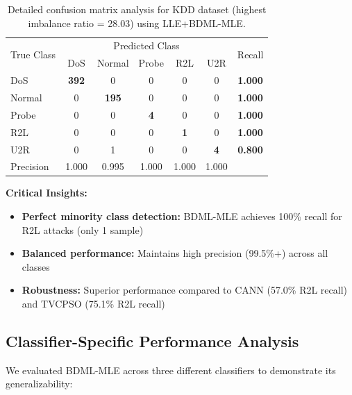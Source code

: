 \documentclass[review]{elsarticle}
\begin{document}
\begin{table}[htbp]
\centering
\caption{Detailed confusion matrix analysis for KDD dataset (highest imbalance ratio = 28.03) using LLE+BDML-MLE.}
\label{tab:kdd_confusion}
\begin{tabular}{l|ccccc|c}
\toprule
\multirow{2}{*}{True Class} & \multicolumn{5}{c|}{Predicted Class} & \multirow{2}{*}{Recall} \\
& DoS & Normal & Probe & R2L & U2R & \\
\midrule
DoS & \textbf{392} & 0 & 0 & 0 & 0 & \textbf{1.000} \\
Normal & 0 & \textbf{195} & 0 & 0 & 0 & \textbf{1.000} \\
Probe & 0 & 0 & \textbf{4} & 0 & 0 & \textbf{1.000} \\
R2L & 0 & 0 & 0 & \textbf{1} & 0 & \textbf{1.000} \\
U2R & 0 & 1 & 0 & 0 & \textbf{4} & \textbf{0.800} \\
\midrule
Precision & 1.000 & 0.995 & 1.000 & 1.000 & 1.000 & \\
\bottomrule
\end{tabular}
\end{table}

\textbf{Critical Insights:}
\begin{itemize}
\item \textbf{Perfect minority class detection:} BDML-MLE achieves 100\% recall for R2L attacks (only 1 sample)
\item \textbf{Balanced performance:} Maintains high precision (99.5\%+) across all classes
\item \textbf{Robustness:} Superior performance compared to CANN (57.0\% R2L recall) and TVCPSO (75.1\% R2L recall)
\end{itemize}

\subsection{Classifier-Specific Performance Analysis}

We evaluated BDML-MLE across three different classifiers to demonstrate its generalizability:
\end{document}
